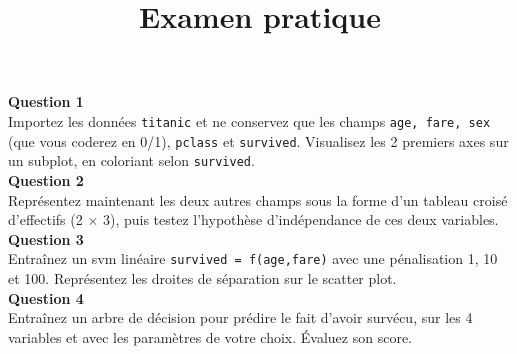 \documentclass[a4paper]{article}
\title{Examen pratique}
\date{}
\begin{document}
\maketitle

\textbf{Question 1}\\

Importez les données \texttt{titanic} et ne conservez que les champs \texttt{age, fare, sex} (que vous coderez en 0/1), \texttt{pclass} et \texttt{survived}. Visualisez les 2 premiers axes sur un subplot, en coloriant selon \texttt{survived}.\\

\textbf{Question 2}\\

Représentez maintenant les deux autres champs sous la forme d'un tableau croisé d'effectifs (2 $\times$ 3), puis testez l'hypothèse d'indépendance de ces deux variables.\\

\textbf{Question 3}\\

Entraînez un svm linéaire \texttt{survived = f(age,fare)} avec une pénalisation 1, 10 et 100. Représentez les droites de séparation sur le scatter plot.\\

\textbf{Question 4}\\

Entraînez un arbre de décision pour prédire le fait d'avoir survécu, sur les 4 variables et avec les paramètres de votre choix. {\'E}valuez son score.
\end{document}
